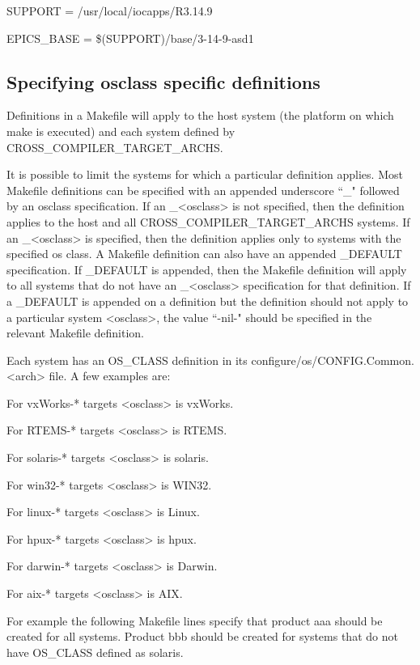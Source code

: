 SUPPORT = /usr/local/iocapps/R3.14.9 

EPICS\_BASE = \$(SUPPORT)/base/3-14-9-asd1

\subsection{Specifying osclass specific definitions}

Definitions in a Makefile will apply to the host system (the platform on which make is executed) and each system defined 
by CROSS\_COMPILER\_TARGET\_ARCHS.

It is possible to limit the systems for which a particular definition applies. Most Makefile definitions can be specified with 
an appended underscore ``\_" followed by an osclass specification. If an \_\textless{}osclass\textgreater{} is not specified, then the definition 
applies to the host and all CROSS\_COMPILER\_TARGET\_ARCHS systems. If an \_\textless{}osclass\textgreater{} is specified, then the 
definition applies only to systems with the specified os class. A Makefile definition can also have an appended 
\_DEFAULT specification. If \_DEFAULT is appended, then the Makefile definition will apply to all systems that do not 
have an \_\textless{}osclass\textgreater{} specification for that definition. If a \_DEFAULT is appended on a definition but the definition should 
not apply to a particular system \textless{}osclass\textgreater{}, the value ``-nil-" should be specified in the relevant Makefile definition.

Each system has an OS\_CLASS definition in its configure/os/CONFIG.Common.\textless{}arch\textgreater{} file. A few examples are:

\begin{description}\item For vxWorks-* targets \textless{}osclass\textgreater{} is vxWorks.

\item For RTEMS-* targets \textless{}osclass\textgreater{} is RTEMS.

\item For solaris-* targets \textless{}osclass\textgreater{} is solaris.

\item For win32-* targets \textless{}osclass\textgreater{} is WIN32.

\item For linux-* targets \textless{}osclass\textgreater{} is Linux.

\item For hpux-* targets \textless{}osclass\textgreater{} is hpux.

\item For darwin-* targets \textless{}osclass\textgreater{} is Darwin.

\item For aix-* targets \textless{}osclass\textgreater{} is AIX.

\end{description}For example the following Makefile lines specify that product aaa should be created for all systems. Product bbb should 
be created for systems that do not have OS\_CLASS defined as solaris.

